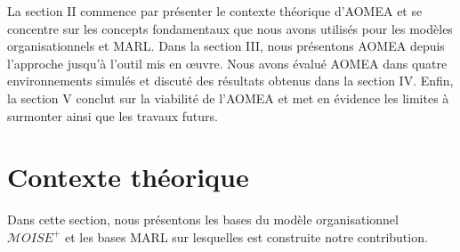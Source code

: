 \documentclass[contribution]{jfsma}
\begin{document}


La section II commence par présenter le contexte théorique d'AOMEA et se concentre sur les concepts fondamentaux que nous avons utilisés pour les modèles organisationnels et MARL.
Dans la section III, nous présentons AOMEA depuis l’approche jusqu’à l’outil mis en œuvre. Nous avons évalué AOMEA dans quatre environnements simulés et discuté des résultats obtenus dans la section IV. Enfin, la section V conclut sur la viabilité de l'AOMEA et met en évidence les limites à surmonter ainsi que les travaux futurs.


\section{Contexte théorique}





Dans cette section, nous présentons les bases du modèle organisationnel $\mathcal{M}OISE^+$ et les bases MARL sur lesquelles est construite notre contribution.
\end{document}

